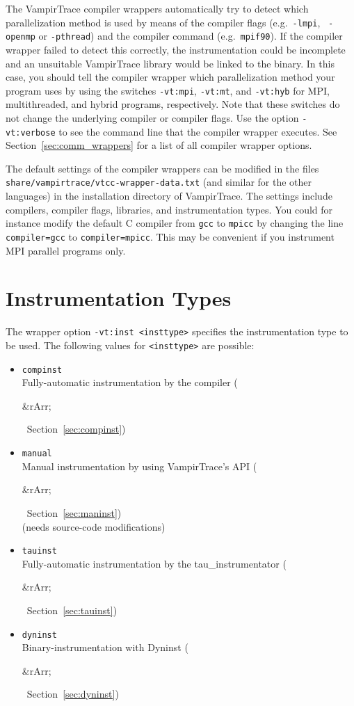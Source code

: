\documentclass[a4paper,twoside,12pt,BCOR12mm]{scrbook}
\newcommand{\pathname}[1]{\nolinkurl{#1}}  %
\renewcommand{\pathname}[1]{\texttt{#1}}   %
\newcommand{\rarr}{$\Rightarrow$}  %
\renewcommand{\rarr}{\begin{rawhtml}&rArr;\end{rawhtml}}   %
\begin{document}
The VampirTrace compiler wrappers automatically try to detect which parallelization
method is used by means of the compiler flags (e.g.~\texttt{-lmpi}, ~\texttt{-openmp} 
or \texttt{-pthread}) and the compiler command (e.g.~\texttt{mpif90}).
If the compiler wrapper failed to detect this correctly,
the instrumentation could be incomplete and an unsuitable
VampirTrace library would be linked to the binary.
In this case, you should tell the compiler wrapper which parallelization method
your program uses by using the switches
\texttt{-vt:mpi}, \texttt{-vt:mt}, and \texttt{-vt:hyb} for MPI, multithreaded, and
hybrid programs, respectively.
Note that these switches do not change the underlying compiler or compiler flags.
Use the option \texttt{-vt:verbose} to see the command line that the compiler wrapper 
executes. See Section~\ref{sec:comm_wrappers} for a list of all compiler wrapper options.

The default settings of the compiler wrappers can be modified in the files
\pathname{share/vampirtrace/vtcc-wrapper-data.txt} (and similar for the other languages)
in the installation directory of VampirTrace.
The settings include compilers, compiler flags, libraries, and instrumentation types.
You could for instance modify the default C compiler 
from \texttt{gcc}
to \texttt{mpicc} by changing the line \texttt{compiler=gcc} to \texttt{compiler=mpicc}.
This may be convenient if you instrument MPI parallel programs only.


\section{Instrumentation Types}
\label{sec:instrumentation_types}

The wrapper option \texttt{-vt:inst <insttype>} specifies the 
instrumentation\latex{\linebreak} type to be used. The following values for 
\texttt{<insttype>} are possible:


\begin{itemize}
\item \texttt{compinst} \\
Fully-automatic instrumentation by the compiler (\rarr\ Section~\ref{sec:compinst})

\item \texttt{manual} \\
Manual instrumentation by using VampirTrace's API (\rarr\ Section~\ref{sec:maninst}) \\
(needs source-code modifications)

\item \texttt{tauinst} \\
Fully-automatic instrumentation by the tau\_instrumentator (\rarr\ Section~\ref{sec:tauinst})

\item \texttt{dyninst} \\
Binary-instrumentation with Dyninst (\rarr\ Section~\ref{sec:dyninst})

\end{itemize}
\end{document}
